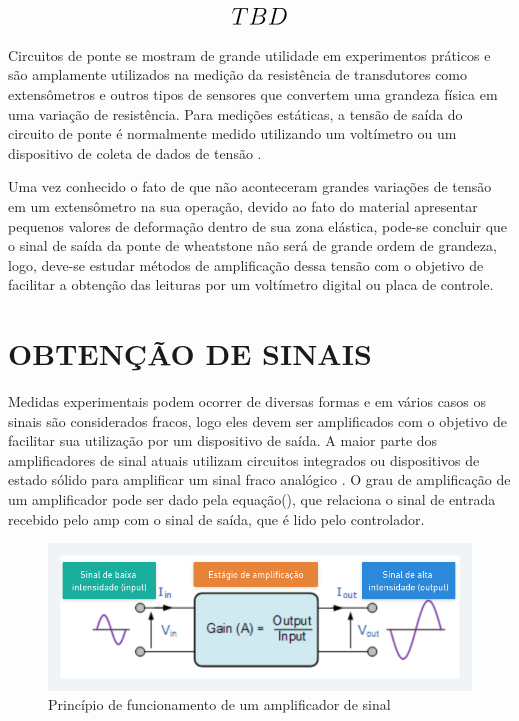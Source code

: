 \begin{equation}\label{eq:Eq_220}%
\mbox{\fontsize{17.28}{21.6}\selectfont\( %
TBD
\)} %
\end{equation}

\hfill

Circuitos de ponte se mostram de grande utilidade em experimentos práticos e são amplamente utilizados na medição da resistência de transdutores como extensômetros e outros tipos de sensores que convertem uma grandeza física em uma variação de resistência. Para medições estáticas, a tensão de saída do circuito de ponte é normalmente medido utilizando um voltímetro ou um dispositivo de coleta de dados de tensão \autocite{Hollman2011}.

Uma vez conhecido o fato de que não aconteceram grandes variações de tensão em um extensômetro na sua operação, devido ao fato do material apresentar pequenos valores de deformação dentro de sua zona elástica, pode-se concluir que o sinal de saída da ponte de wheatstone não será de grande ordem de grandeza, logo, deve-se estudar métodos de amplificação dessa tensão com o objetivo de facilitar a obtenção das leituras por um voltímetro digital ou placa de controle.

\section{OBTENÇÃO DE SINAIS}

Medidas experimentais podem ocorrer de diversas formas e em vários casos os sinais são considerados fracos, logo eles devem ser amplificados com o objetivo de facilitar sua utilização por um dispositivo de saída. A maior parte dos amplificadores de sinal atuais utilizam circuitos integrados ou dispositivos de estado sólido para amplificar um sinal fraco analógico \autocite{Hollman2011}. O grau de amplificação de um amplificador pode ser dado pela equação(), que relaciona o sinal de entrada recebido pelo amp com o sinal de saída, que é lido pelo controlador.

\begin{figure}[htb]
	\caption{\label{fig:1100} Princípio de funcionamento de um amplificador de sinal}
	\begin{center}
		\includegraphics[width=\textwidth]{pictures/1100.png}
	\end{center}
\end{figure}

